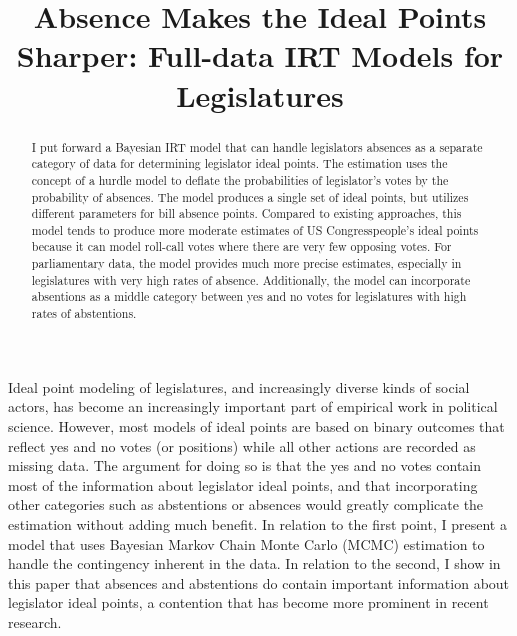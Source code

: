 %

\title{Absence Makes the Ideal Points Sharper: Full-data IRT Models for Legislatures}
\usepackage{amsmath,amsthm, amssymb, latexsym}
\linespread{1.5}

	
	\maketitle
	
	\begin{abstract}
		I put forward a Bayesian IRT model that can handle legislators absences as a separate category of data for determining legislator ideal points. The estimation uses the concept of a hurdle model to deflate the probabilities of legislator’s votes by the probability of absences. The model produces a single set of ideal points, but utilizes different parameters for bill absence points. Compared to existing approaches, this model tends to produce more moderate estimates of US Congresspeople’s ideal points because it can model roll-call votes where there are very few opposing votes. For parliamentary data, the model provides much more precise estimates, especially in legislatures with very high rates of absence. Additionally, the model can incorporate absentions as a middle category between yes and no votes for legislatures with high rates of abstentions.
	\end{abstract}
	
	Ideal point modeling of legislatures, and increasingly diverse kinds of social actors, has become an increasingly important part of empirical work in political science. However, most models of ideal points are based on binary outcomes that reflect yes and no votes (or positions) while all other actions are recorded as missing data. The argument for doing so is that the yes and no votes contain most of the information about legislator ideal points, and that incorporating other categories such as abstentions or absences would greatly complicate the estimation without adding much benefit. In relation to the first point, I present a model that uses Bayesian Markov Chain Monte Carlo (MCMC) estimation to handle the contingency inherent in the data. In relation to the second, I show in this paper that absences and abstentions do contain important information about legislator ideal points, a contention that has become more prominent in recent research.
	
